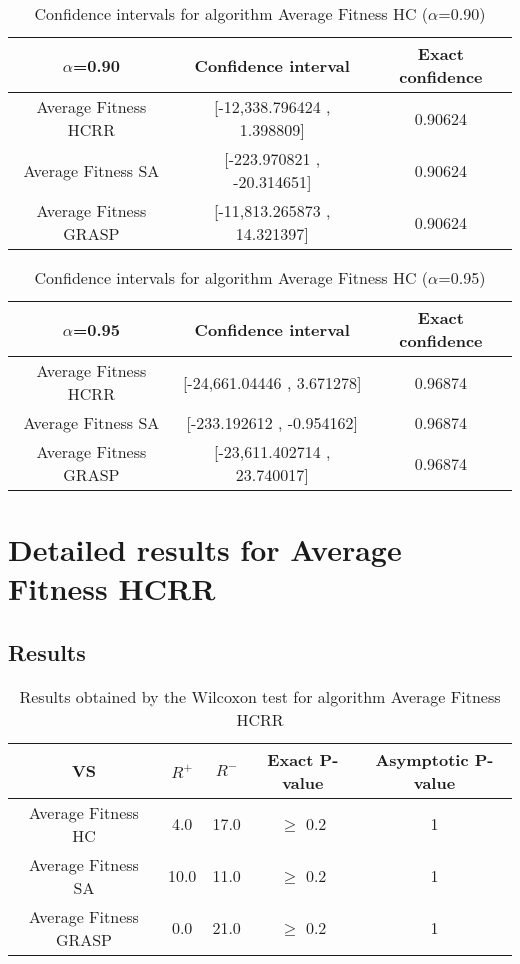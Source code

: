 \documentclass[a4paper,10pt]{article}
\begin{document}
\begin{table}[!htp]
\centering\small
\begin{tabular}{
|c|c|c|}
\hline
 $\alpha$=0.90 & Confidence interval & Exact confidence \\ \hline 
Average Fitness HCRR    & [-12,338.796424 , 1.398809] & 0.90624\\ \hline 
Average Fitness SA   & [-223.970821 , -20.314651] & 0.90624\\ \hline 
Average Fitness GRASP & [-11,813.265873 , 14.321397] & 0.90624\\ \hline 

\end{tabular}
\caption{Confidence intervals for algorithm Average Fitness HC     ($\alpha$=0.90)}
\end{table}
\begin{table}[!htp]
\centering\small
\begin{tabular}{
|c|c|c|}
\hline
 $\alpha$=0.95 & Confidence interval & Exact confidence \\ \hline 
Average Fitness HCRR    & [-24,661.04446 , 3.671278] & 0.96874\\ \hline 
Average Fitness SA   & [-233.192612 , -0.954162] & 0.96874\\ \hline 
Average Fitness GRASP & [-23,611.402714 , 23.740017] & 0.96874\\ \hline 

\end{tabular}
\caption{Confidence intervals for algorithm Average Fitness HC     ($\alpha$=0.95)}
\end{table}

 \clearpage 


\section{Detailed results for Average Fitness HCRR   }


\subsection{Results}

\begin{table}[!htp]
\centering\small
\begin{tabular}{
|c|c|c|c|c|}
\hline
 VS & $R^{+}$ & $R^{-}$ & Exact P-value & Asymptotic P-value \\ \hline 
Average Fitness HC     & 4.0 & 17.0 & $\geq$ 0.2 & 1\\ \hline 
Average Fitness SA   & 10.0 & 11.0 & $\geq$ 0.2 & 1\\ \hline 
Average Fitness GRASP & 0.0 & 21.0 & $\geq$ 0.2 & 1\\ \hline 

\end{tabular}
\caption{Results obtained by the Wilcoxon test for algorithm Average Fitness HCRR   }
\end{table}
\end{document}
